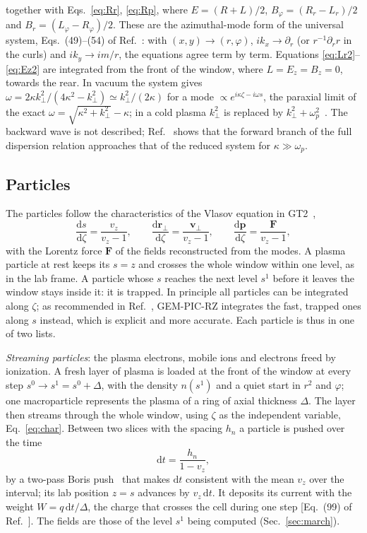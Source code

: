 \documentclass[aps,prab,reprint,floatfix,superscriptaddress,amsmath,amssymb]{revtex4-2}
\newcommand{\dd}{\mathrm{d}}
\begin{document}
together with Eqs.~\eqref{eq:Rr}, \eqref{eq:Rp}, where $E = (R + L)/2$, $B_\varphi = (R_r - L_r)/2$ and $B_r = (L_\varphi - R_\varphi)/2$. These are the azimuthal-mode form of the universal system, Eqs.~(49)--(54) of Ref.~\cite{GEMPIC}: with $(x, y) \to (r, \varphi)$, $ik_x \to \partial_r$ (or $r^{-1}\partial_r r$ in the curls) and $ik_y \to im/r$, the equations agree term by term. Equations \eqref{eq:Lr2}--\eqref{eq:Ez2} are integrated from the front of the window, where $L = E_z = B_z = 0$, towards the rear. In vacuum the system gives $\omega = 2\kappa k_\perp^2/(4\kappa^2 - k_\perp^2) \simeq k_\perp^2/(2\kappa)$ for a mode $\propto e^{i\kappa\zeta - i\omega s}$, the paraxial limit of the exact $\omega = \sqrt{\kappa^2 + k_\perp^2} - \kappa$; in a cold plasma $k_\perp^2$ is replaced by $k_\perp^2 + \omega_p^2$~\cite{GEMPIC}. The backward wave is not described; Ref.~\cite{GEMPIC} shows that the forward branch of the full dispersion relation approaches that of the reduced system for $\kappa \gg \omega_p$.

\subsection{Particles}\label{sec:particles}

The particles follow the characteristics of the Vlasov equation in GT2~\cite{GEMPIC},
\begin{equation}
\frac{\dd s}{\dd\zeta} = \frac{v_z}{v_z - 1}, \qquad \frac{\dd \bm r_\perp}{\dd\zeta} = \frac{\bm v_\perp}{v_z - 1}, \qquad \frac{\dd \bm p}{\dd\zeta} = \frac{\bm F}{v_z - 1}, \label{eq:char}
\end{equation}
with the Lorentz force $\bm F$ of the fields reconstructed from the modes. A plasma particle at rest keeps its $s = z$ and crosses the whole window within one level, as in the lab frame. A particle whose $s$ reaches the next level $s^1$ before it leaves the window stays inside it: it is trapped. In principle all particles can be integrated along $\zeta$; as recommended in Ref.~\cite{GEMPIC}, GEM-PIC-RZ integrates the fast, trapped ones along $s$ instead, which is explicit and more accurate. Each particle is thus in one of two lists.

\emph{Streaming particles}: the plasma electrons, mobile ions and electrons freed by ionization. A fresh layer of plasma is loaded at the front of the window at every step $s^0 \to s^1 = s^0 + \Delta$, with the density $n(s^1)$ and a quiet start in $r^2$ and $\varphi$; one macroparticle represents the plasma of a ring of axial thickness $\Delta$. The layer then streams through the whole window, using $\zeta$ as the independent variable, Eq.~\eqref{eq:char}. Between two slices with the spacing $h_n$ a particle is pushed over the time
\begin{equation}
\dd t = \frac{h_n}{1 - v_z}, \label{eq:dt}
\end{equation}
by a two-pass Boris push~\cite{Boris1970} that makes $\dd t$ consistent with the mean $v_z$ over the interval; its lab position $z = s$ advances by $v_z\,\dd t$. It deposits its current with the weight $W = q\,\dd t/\Delta$, the charge that crosses the cell during one step [Eq.~(99) of Ref.~\cite{GEMPIC}]. The fields are those of the level $s^1$ being computed (Sec.~\ref{sec:march}).
\end{document}
